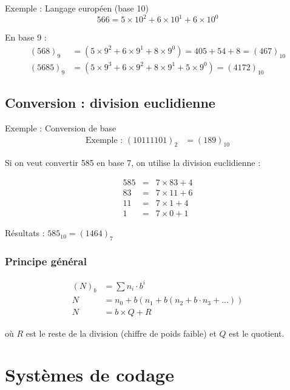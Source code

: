 \documentclass[a4paper,12pt]{article}
\begin{document}
\begin{examplebox}{Exemple : Langage européen (base 10)}
\[566 = 5 \times 10^2 + 6 \times 10^1 + 6 \times 10^0\]

\vspace{0.3cm}
En base 9 :
\begin{align*}
(568)_9 &= (5 \times 9^2 + 6 \times 9^1 + 8 \times 9^0) = 405 + 54 + 8 = (467)_{10} \\
(5685)_9 &= (5 \times 9^3 + 6 \times 9^2 + 8 \times 9^1 + 5 \times 9^0) = (4172)_{10}
\end{align*}
\end{examplebox}

\subsection{Conversion : division euclidienne}

\begin{examplebox}{Exemple : Conversion de base}
\begin{align*}
\text{Exemple : } (10111101)_2 &= (189)_{10}
\end{align*}

\vspace{0.3cm}
Si on veut convertir 585 en base 7, on utilise la division euclidienne :

\[
\begin{array}{rcl}
585 &=& 7 \times 83 + 4 \\
83 &=& 7 \times 11 + 6 \\
11 &=& 7 \times 1 + 4 \\
1 &=& 7 \times 0 + 1
\end{array}
\]

Résultats : $585_{10} = (1464)_7$
\end{examplebox}

\subsubsection{Principe général}

\begin{align*}
(N)_b &= \sum n_i \cdot b^i \\
N &= n_0 + b(n_1 + b(n_2 + b \cdot n_3 + \ldots)) \\
N &= b \times Q + R
\end{align*}

où $R$ est le reste de la division (chiffre de poids faible) et $Q$ est le quotient.

\newpage
\section{Systèmes de codage}
\end{document}
